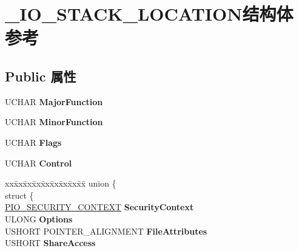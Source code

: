 \hypertarget{struct___i_o___s_t_a_c_k___l_o_c_a_t_i_o_n}{}\section{\+\_\+\+I\+O\+\_\+\+S\+T\+A\+C\+K\+\_\+\+L\+O\+C\+A\+T\+I\+O\+N结构体 参考}
\label{struct___i_o___s_t_a_c_k___l_o_c_a_t_i_o_n}
\subsection*{Public 属性}
\begin{DoxyCompactItemize}
\item 
\mbox{\label{struct___i_o___s_t_a_c_k___l_o_c_a_t_i_o_n_a0c4306fbe9b606b207130cd9555da08c}} 
U\+C\+H\+AR {\bfseries Major\+Function}
\item 
\mbox{\label{struct___i_o___s_t_a_c_k___l_o_c_a_t_i_o_n_aa32fbb850d1754853d85dbdefe85641c}} 
U\+C\+H\+AR {\bfseries Minor\+Function}
\item 
\mbox{\label{struct___i_o___s_t_a_c_k___l_o_c_a_t_i_o_n_aff051d905a4798d6db4a9f8d42621364}} 
U\+C\+H\+AR {\bfseries Flags}
\item 
\mbox{\label{struct___i_o___s_t_a_c_k___l_o_c_a_t_i_o_n_ae1662d0c3a3a9e54fd1b1b68928e6750}} 
U\+C\+H\+AR {\bfseries Control}
\item 
\mbox{\label{struct___i_o___s_t_a_c_k___l_o_c_a_t_i_o_n_a562d1865cc5ddbe21deee124be55e1d1}} 
\begin{tabbing}
xx\=xx\=xx\=xx\=xx\=xx\=xx\=xx\=xx\=\kill
union \{\\
\>struct \{\\
\>\>\hyperlink{struct___i_o___s_e_c_u_r_i_t_y___c_o_n_t_e_x_t}{PIO\_SECURITY\_CONTEXT} {\bfseries SecurityContext}\\
\>\>ULONG {\bfseries Options}\\
\>\>USHORT POINTER\_ALIGNMENT {\bfseries FileAttributes}\\
\>\>USHORT {\bfseries ShareAccess}\\

\end{tabbing}
\end{DoxyCompactItemize}
